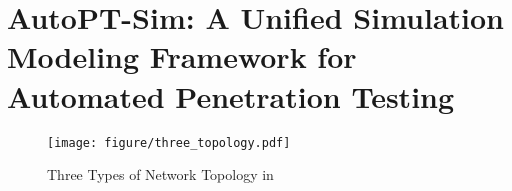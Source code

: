 \section{AutoPT-Sim: A Unified Simulation Modeling Framework for Automated Penetration Testing}

\begin{figure*}[tb]
    \centering
    \texttt{[image: figure/three\_topology.pdf]}
    \caption{Three Types of Network Topology in~\modelsim}
    \label{three_kind_topology}
\end{figure*}


